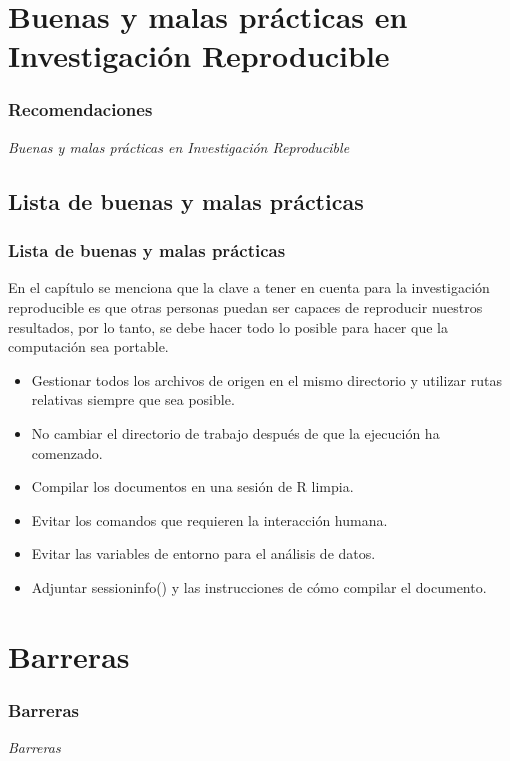 \documentclass[11pt]{beamer}					%
\begin{document}
			\section{Buenas y malas prácticas en Investigación Reproducible}	
		 \begin{frame}[fragile]
		 
			\frametitle{Recomendaciones}
			\begin{huge}
			\begin{center}
				\emph{\textit{Buenas y malas prácticas en Investigación Reproducible}}
			\end{center}
			\end{huge}
		\end{frame}		
		\subsection{Lista de buenas y malas prácticas}			
		 \begin{frame}[fragile]						%
			\frametitle{Lista de buenas y malas prácticas}
En el capítulo se menciona que la clave a tener en cuenta
para la investigación reproducible es que otras personas puedan
ser capaces de reproducir nuestros resultados, por lo tanto, se
debe hacer todo lo posible para hacer que la computación sea portable.			
			
	\begin{itemize}
			    \item Gestionar todos los archivos de origen en el mismo directorio y utilizar rutas relativas siempre que sea posible.
				\item No cambiar el directorio de trabajo después de que la ejecución ha comenzado.
				\item Compilar los documentos en una sesión de R limpia.
				\item Evitar los comandos que requieren la interacción humana.
				\item Evitar las variables de entorno para el análisis de datos.
				\item Adjuntar sessioninfo() y las instrucciones de cómo compilar el documento.
				
				\end{itemize}
		\end{frame}
		
	\section{Barreras}	
		 \begin{frame}[fragile]
			\frametitle{Barreras}
			\begin{huge}
			\begin{center}
				\emph{\textit{Barreras}}
			\end{center}
			\end{huge}
		\end{frame}		
\end{document}
